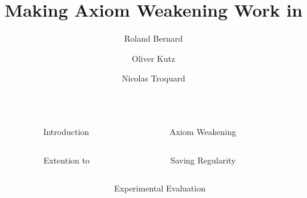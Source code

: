 \documentclass[final]{beamer}
\title{Making Axiom Weakening Work in \bfSROIQ}
\author{Roland Bernard \and Oliver Kutz \and Nicolas Troquard}
\institute[shortinst]{Free University of Bozen-Bolzano}
\newlength{\sepwidth}
\newlength{\colwidth}
\newcommand{\separatorcolumn}{\begin{column}{\sepwidth}\end{column}}
\begin{document}
\begin{frame}[t]
  
\begin{columns}[t]
\separatorcolumn

\begin{column}{\colwidth}

  \begin{block}{Introduction}

  \end{block}

\end{column}

\separatorcolumn

\begin{column}{\colwidth}

  \begin{block}{Axiom Weakening}

  \end{block}

\end{column}
\separatorcolumn

\end{columns}

\begin{columns}[t]
\separatorcolumn

\begin{column}{\colwidth}

  \begin{block}{Extention to \bfSROIQ}

  \end{block}

\end{column}

\separatorcolumn

\begin{column}{\colwidth}

  \begin{block}{Saving Regularity}

  \end{block}

\end{column}
\separatorcolumn

\end{columns}

\begin{columns}[t]
\separatorcolumn

\begin{column}{\colwidth}

  \begin{block}{Experimental Evaluation}


\end{block}
\end{column}
\end{columns}
\end{frame}
\end{document}

